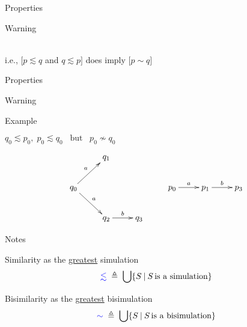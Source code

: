 \documentclass{beamer}
\begin{document}
\begin{slide}{Properties}
\centering
\begin{alertblock}{Warning}
\centering
{}
\end{alertblock}

~\\[5mm]
i.e., $\Big[p\lesssim q$ and $q\lesssim p\Big]$ does  imply
  $\Big[p \sim q\Big]$
\end{slide}


\begin{slide}{Properties}

\small

\begin{alertblock}{Warning}
\centering
{}
\end{alertblock}

\begin{block}{Example}
\begin{center}
$q_0 \lesssim p_0,\;  p_0 \lesssim q_0\;\;\; \text{but}\;\;\;  p_0 \not \sim q_0$
\end{center}

\begin{equation*}
\xymatrix{
& q_1  & & & & \\
q_0 \ar[ru]^{a} \ar[rd]^{a} &  & & p_0 \ar[r]^{a} & p_1 \ar[r]^{b} & p_3\\
& q_2  \ar[r]^{b} & q_3 &       &        &                          
}
\end{equation*}
\end{block}
\end{slide}




\begin{slide}{Notes}
\small
\begin{block}{Similarity as the \underline{greatest} simulation}
\begin{equation*}
\textcolor{blue}{\lesssim}\;  \triangleq\; \bigcup \mathopen{\{} S \mathbin{|} S\, \text{is a simulation} \mathclose{\}} 
\end{equation*}
\end{block}
\begin{block}{Bisimilarity as the \underline{greatest} bisimulation}
\begin{equation*}
\textcolor{blue}{\sim}\;  \triangleq\; \bigcup \mathopen{\{} S \mathbin{|} S\, \text{is a bisimulation} \mathclose{\}} 
\end{equation*}
\end{block}
\end{slide}
\end{document}

